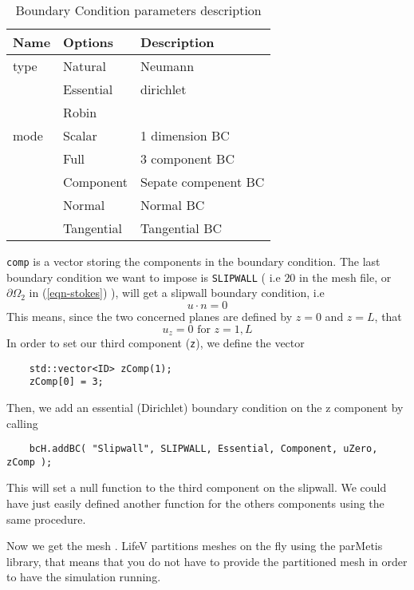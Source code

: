 \begin{table}
\begin{center}
\begin{tabular}{|l|l|l|}
\hline
Name & Options & Description \\
\hline \hline
type &  Natural & Neumann\\
& Essential & dirichlet \\
& Robin\\

\hline
mode & Scalar & 1 dimension BC \\
& Full & 3 component BC \\
& Component  & Sepate compenent BC \\
& Normal & Normal BC \\
& Tangential & Tangential BC \\
\hline

\end{tabular}
\end{center}
\caption{ Boundary Condition parameters description
}
\label{table-bcparams}
\end{table}

\verb!comp! is a vector storing the components in the boundary condition.
The last boundary condition we want to impose is 
\verb!SLIPWALL! 
( i.e $20$ in the mesh file, or $\partial \Omega_2$ in (\ref{eqn-stokes}) ), will get 
a slipwall boundary condition, i.e
\begin{equation}\label{eqn-slipwallbc}
u \cdot n = 0
\end{equation}
This means, since the two concerned planes are defined by $z = 0$ and $z = L$, that
\begin{equation*}
u_z = 0 \mbox{ for } z=1,L
\end{equation*}
In order to set our third component (\verb!z!), we define the vector
\begin{verbatim}
    std::vector<ID> zComp(1);
    zComp[0] = 3;
\end{verbatim}
Then, we add an essential (Dirichlet) boundary condition on the z component by calling
\begin{verbatim}
    bcH.addBC( "Slipwall", SLIPWALL, Essential, Component, uZero, zComp );
\end{verbatim}
This will set a null function to the third component on the slipwall. We could have just easily defined
another function for the others components using the same procedure.

Now we get the mesh . LifeV partitions meshes  on the fly
using the parMetis library, that means that you do not have to provide the partitioned mesh in
order to have the simulation running.

